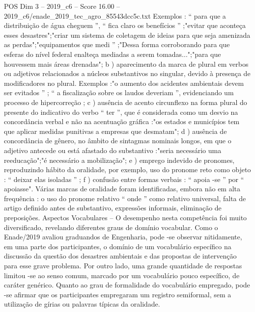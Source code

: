\begin{textsample}{POS Dim 3 – 2019\_c6 – Score 16.00 – 2019\_c6/enade\_2019\_tec\_agro\_85543dcc5c.txt}
Exemplos : “ para que a distribuição de água cheguem ”, “ fica claro os benefícios ” ;"evitar que aconteça esses desastres";"criar um sistema de coletagem de ideias para que seja amenizada as perdas";"equipamentos que medi ” ;"Dessa forma corroborando para que esferas do nível federal enalteça mediadas a serem tomadas...";"para que houvessem mais áreas drenadas"; b ) aparecimento da marca de plural em verbos ou adjetivos relacionados a núcleos substantivos no singular, devido à presença de modificadores no plural.
Exemplos :"o aumento dos acidentes ambientais devem ser evitados ” ; “ a fiscalização sobre os laudos deveriam ”, evidenciando um processo de hipercorreção ; c ) ausência de acento circunflexo na forma plural do presente do indicativo do verbo “ ter ”, que é considerada como um desvio na concordância verbal e não na acentuação gráfica :"os estados e municípios tem que aplicar medidas punitivas a empresas que desmatam"; d ) ausência de concordância de gênero, no âmbito de sintagmas nominais longos, em que o adjetivo antecede ou está afastado do substantivo :"seria necessário uma reeducação";"é necessário a mobilização"; e ) emprego indevido de pronomes, reproduzindo hábito da oralidade, por exemplo, uso do pronome reto como objeto : “ deixar elas isoladas ” ; f ) confusão entre formas verbais : “ apoia -se ” por “ apoiasse".
Várias marcas de oralidade foram identificadas, embora não em alta frequência : o uso do pronome relativo “ onde ” como relativo universal, falta de artigo definido antes de substantivo, expressões informais, eliminação de preposições.
Aspectos Vocabulares – O desempenho nesta competência foi muito diversificado, revelando diferentes graus de domínio vocabular.
Como o Enade/2019 avaliou graduandos de Engenharia, pode -se observar nitidamente, em uma parte dos participantes, o domínio de um vocabulário específico na discussão da questão dos desastres ambientais e das propostas de intervenção para esse grave problema.
Por outro lado, uma grande quantidade de respostas limitou -se ao senso comum, marcado por um vocabulário pouco específico, de caráter genérico.
Quanto ao grau de formalidade do vocabulário empregado, pode -se afirmar que os participantes empregaram um registro semiformal, sem a utilização de gírias ou palavras típicas da oralidade.

\end{textsample}
